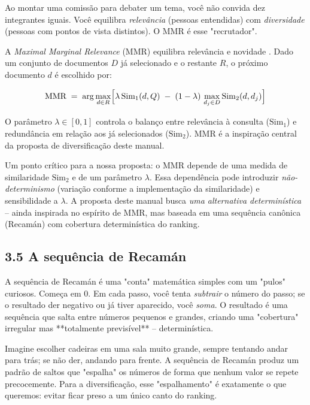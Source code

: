 \begin{intuicao}
Ao montar uma comissão para debater um tema, você não convida dez integrantes
iguais. Você equilibra \emph{relevância} (pessoas entendidas) com
\emph{diversidade} (pessoas com pontos de vista distintos). O MMR é esse
"recrutador".
\end{intuicao}

 A \emph{Maximal Marginal Relevance} (MMR) equilibra relevância e
novidade \cite{CarbonellGoldstein1998MMR}. Dado um conjunto de documentos $D$ já
selecionado e o restante $R$, o próximo documento $d$ é escolhido por:

\begin{equation}
\label{eq:mmr}
\text{MMR} \;=\; \arg\max_{d \in R}\Bigl[
\lambda\,\text{Sim}_1(d,Q)\;-\;(1-\lambda)\,
\max_{d_j \in D}\text{Sim}_2(d,d_j)
\Bigr]
\end{equation}

O parâmetro $\lambda \in [0,1]$ controla o balanço entre relevância à consulta
($\text{Sim}_1$) e redundância em relação aos já selecionados ($\text{Sim}_2$).
MMR é a inspiração central da proposta de diversificação deste manual.

 Um ponto crítico para a nossa proposta: o MMR depende de uma medida de
similaridade $\text{Sim}_2$ e de um parâmetro $\lambda$. Essa dependência pode
introduzir \emph{não-determinismo} (variação conforme a implementação da
similaridade) e sensibilidade a $\lambda$. A proposta deste manual busca
\emph{uma alternativa determinística} -- ainda inspirada no espírito de MMR, mas
baseada em uma sequência canônica (Recamán) com cobertura determinística do
ranking.

\subsection*{3.5 A sequência de Recamán}

 A sequência de Recamán é uma "conta" matemática simples com um "pulos"
curiosos. Começa em 0. Em cada passo, você tenta \emph{subtrair} o número do passo;
se o resultado der negativo ou já tiver aparecido, você \emph{soma}. O resultado é
uma sequência que salta entre números pequenos e grandes, criando uma "cobertura"
irregular mas **totalmente previsível** -- determinística.

\begin{intuicao}
Imagine escolher cadeiras em uma sala muito grande, sempre tentando andar para
trás; se não der, andando para frente. A sequência de Recamán produz um padrão de
saltos que "espalha" os números de forma que nenhum valor se repete precocemente.
Para a diversificação, esse "espalhamento" é exatamente o que queremos: evitar
ficar preso a um único canto do ranking.
\end{intuicao}

